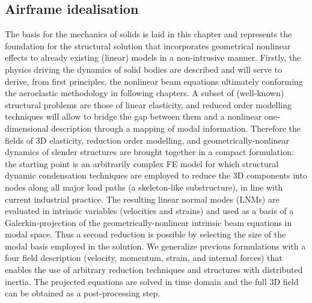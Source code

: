 \documentclass[11pt]{article}
\begin{document}
\subsection{Airframe idealisation}
\label{sec:org78ded7e}
The basis for the mechanics of solids is laid in this chapter and represents the foundation for the structural solution that incorporates geometrical nonlinear effects to already existing (linear) models in a non-intrusive manner. Firstly, the physics driving the dynamics of solid bodies are described and will serve to derive, from first principles, the nonlinear beam equations ultimately conforming the aeroelastic methodology in following chapters. A subset of (well-known) structural problems are those of linear elasticity, and reduced order modelling techniques will allow to bridge the gap between them and a nonlinear one-dimensional description  through  a mapping of modal information. Therefore the fields of 3D elasticity, reduction order modelling, and geometrically-nonlinear dynamics of slender structures are brought together in a compact formulation: the starting point is an arbitrarily complex FE model for which structural dynamic condensation techniques are employed to reduce the 3D components into nodes along all major load paths (a skeleton-like substructure), in line with current industrial practice. The resulting linear normal modes (LNMs)  are evaluated in intrinsic variables (velocities and strains) and used as a basis of a Galerkin-projection of the geometrically-nonlinear intrinsic beam equations in modal space. Thus a second  reduction is possible by selecting the size of the modal basis employed in the solution. We generalize previous formulations with a four field description (velocity, momentum, strain, and internal forces) that enables  the use of arbitrary reduction techniques and  structures with distributed inertia. The projected equations are solved in time domain and the full 3D field can be obtained as a post-processing step. \\
\end{document}
